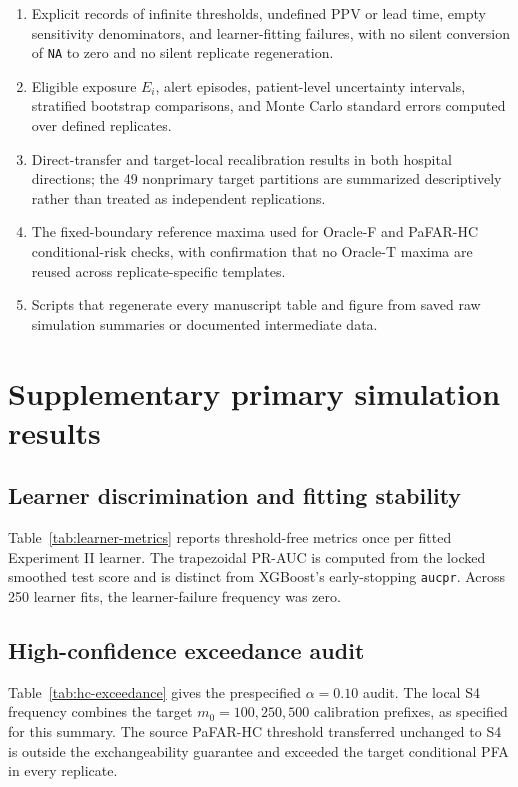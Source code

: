 \documentclass[11pt]{article}
\begin{document}
\begin{enumerate}
    \item Explicit records of infinite thresholds, undefined PPV or lead time, empty sensitivity denominators, and learner-fitting failures, with no silent conversion of \texttt{NA} to zero and no silent replicate regeneration.
    \item Eligible exposure $E_i$, alert episodes, patient-level uncertainty intervals, stratified bootstrap comparisons, and Monte Carlo standard errors computed over defined replicates.
    \item Direct-transfer and target-local recalibration results in both hospital directions; the 49 nonprimary target partitions are summarized descriptively rather than treated as independent replications.
    \item The fixed-boundary reference maxima used for Oracle-F and PaFAR-HC conditional-risk checks, with confirmation that no Oracle-T maxima are reused across replicate-specific templates.
    \item Scripts that regenerate every manuscript table and figure from saved raw simulation summaries or documented intermediate data.
\end{enumerate}

\section{Supplementary primary simulation results}\label{app:primary-supplement}

\renewcommand{\thetable}{S\arabic{table}}
\setcounter{table}{0}

\subsection{Learner discrimination and fitting stability}

Table~\ref{tab:learner-metrics} reports threshold-free metrics once per fitted Experiment II learner. The trapezoidal PR-AUC is computed from the locked smoothed test score and is distinct from XGBoost's early-stopping \texttt{aucpr}. Across 250 learner fits, the learner-failure frequency was zero.



\subsection{High-confidence exceedance audit}

Table~\ref{tab:hc-exceedance} gives the prespecified $\alpha=0.10$ audit. The local S4 frequency combines the target $m_0=100,250,500$ calibration prefixes, as specified for this summary. The source PaFAR-HC threshold transferred unchanged to S4 is outside the exchangeability guarantee and exceeded the target conditional PFA in every replicate.
\end{document}

